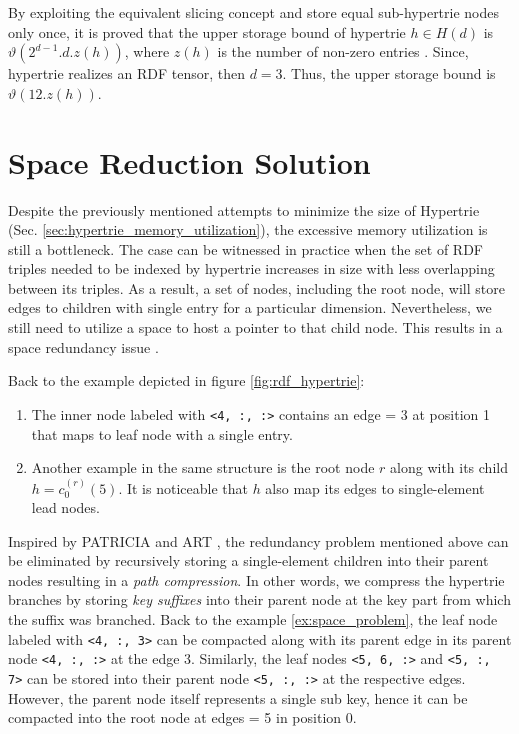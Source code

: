 By exploiting the equivalent slicing concept and store equal sub-hypertrie nodes only once, it is proved that the upper storage bound of hypertrie $h \in H(d)$ is $\vartheta(2^{d-1}. d . z(h))$, where $z(h)$ is the number of non-zero entries \cite{tentris2020}. Since, hypertrie realizes an RDF tensor, then $d=3$. Thus, the upper storage bound is $\vartheta(12 . z(h))$.
\vspace{0.5cm}

\section{Space Reduction Solution}
Despite the previously mentioned attempts to minimize the size of Hypertrie (Sec. \ref{sec:hypertrie_memory_utilization}), the excessive memory utilization is still a bottleneck. The case can be witnessed in practice when the set of RDF triples needed to be indexed by hypertrie increases in size with less overlapping between its triples. As a result, a set of nodes, including the root node, will store edges to children with single entry for a particular dimension. Nevertheless, we still need to utilize a space to host a pointer to that child node. This results in a space redundancy issue \cite{PATRICIA}. 

\begin{example}
\label{ex:space_problem}
Back to the example depicted in figure \ref{fig:rdf_hypertrie}:
\begin{enumerate}
	\item The inner node labeled with \verb|<4, :, :>| contains an edge = 3 at position 1 that maps to leaf node with a single entry. 
	\item Another example in the same structure is the root node $r$ along with its child $h = c_0^{(r)}(5)$. It is noticeable that  $h$ also map its edges to single-element lead nodes.
\end{enumerate}

\end{example}

Inspired by PATRICIA \cite{PATRICIA} and ART \cite{ART}, the redundancy problem mentioned above can be eliminated by recursively storing a single-element children into their parent nodes resulting in a \textit{path compression}. In other words, we compress the hypertrie branches by storing \textit{key suffixes} into their parent node at the key part from which the suffix was branched. Back to the example \ref{ex:space_problem}, the leaf node labeled with \verb|<4, :, 3>| can be compacted along with its parent edge in its parent node \verb|<4, :, :>| at the edge 3. Similarly, the leaf nodes \verb|<5, 6, :>| and \verb|<5, :, 7>| can be stored into their parent node \verb|<5, :, :>| at the respective edges. However, the parent node itself represents a single sub key, hence it can be compacted into the root node at edges = 5 in position 0. \\

